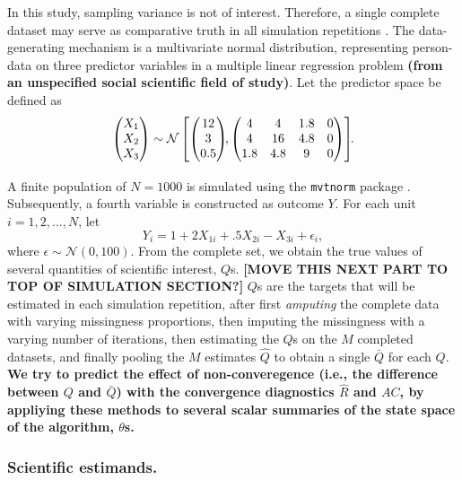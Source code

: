 \documentclass[Royal,times,sageh]{sagej}
\begin{document}
In this study, sampling variance is not of interest. Therefore, a single complete dataset may serve as comparative truth in all simulation repetitions \citep{vink14}. The data-generating mechanism is a multivariate normal distribution, representing person-data on three predictor variables in a multiple linear regression problem \textbf{(from an unspecified social scientific field of study)}. Let the predictor space be defined as
\[
\begin{aligned}
\begin{pmatrix}X_1\\
X_2\\
X_3
\end{pmatrix} \sim \mathcal{N}
\begin{bmatrix}
\begin{pmatrix}
12\\
3\\
0.5
\end{pmatrix}\!\!,
\begin{pmatrix}
4 & 4 & 1.8 & 0\\
4 & 16 & 4.8 & 0\\
1.8 & 4.8 & 9 & 0
\end{pmatrix}
\end{bmatrix}\!\!\text{.}\\[2\jot]
\end{aligned}
\]
A finite population of \(N=1000\) is simulated using the \texttt{mvtnorm} package \citep{mvtnorm}. Subsequently, a fourth variable is constructed as outcome \(Y\). For each unit \(i = 1, 2,..., N\), let
\[
Y_i = 1 + 2X_{1i} +.5X_{2i} - X_{3i} + \epsilon_i ,
\]
where \(\epsilon \sim \mathcal{N}(0, 100)\). From the complete set, we obtain the true values of several quantities of scientific interest, \(Q\)s. \textbf{{[}MOVE THIS NEXT PART TO TOP OF SIMULATION SECTION?{]}} \(Q\)s are the targets that will be estimated in each simulation repetition, after first \emph{amputing} the complete data with varying missingness proportions, then imputing the missingness with a varying number of iterations, then estimating the \(Q\)s on the \(M\) completed datasets, and finally pooling the \(M\) estimates \(\hat{Q}\) to obtain a single \(\bar{Q}\) for each \(Q\). \textbf{We try to predict the effect of non-converegence (i.e., the difference between \(Q\) and \(\bar{Q}\)) with the convergence diagnostics \(\widehat{R}\) and \(AC\), by appliying these methods to several scalar summaries of the state space of the algorithm, \(\theta\)s.}

\hypertarget{scientific-estimands.}{%
\subsubsection{Scientific estimands.}\label{scientific-estimands.}}
\end{document}

